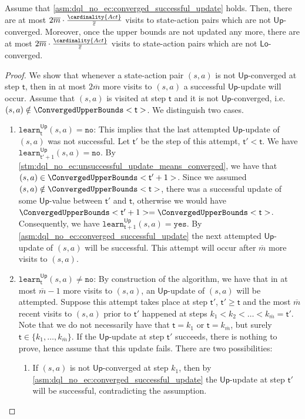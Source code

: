 \documentclass{article}
\newcommand{\Actions}{Act}
\newcommand{\upperbound}{\mathsf{Up}}
\newcommand{\lowerbound}{\mathsf{Lo}}
\newcommand{\updatestep}{{\overline{\varepsilon}}}
\newcommand{\delay}{{\overline{m}}}
\newcommand{\learn}{\texttt{learn}}
\newcommand{\learnyes}{\texttt{yes}}
\newcommand{\learnno}{\texttt{no}}
\newcommand{\algostep}{\mathsf{t}}
\begin{document}
\begin{lemma} \label{stm:dql_no_ec:non_converged_visit_count}
	Assume that \cref{asm:dql_no_ec:converged_successful_update} holds.
	Then, there are at most $2 \delay \cdot \frac{\cardinality{\Actions}}{\updatestep}$ visits to state-action pairs which are not $\upperbound$-converged.
	Moreover, once the upper bounds are not updated any more, there are at most $2 \delay \cdot \frac{\cardinality{\Actions}}{\updatestep}$ visits to state-action pairs which are not $\lowerbound$-converged.
\end{lemma}

\begin{proof}
	We show that whenever a state-action pair $(s, a)$ is not $\upperbound$-converged at step $\algostep$, then in at most $2 \delay$ more visits to $(s, a)$ a successful $\upperbound$-update will occur.
	Assume that $(s, a)$ is visited at step $\algostep$ and it is not $\upperbound$-converged, i.e.\ $(s, a) \notin \ConvergedUpperBounds<\algostep>$.
	We distinguish two cases.
	\begin{enumerate}
		\item $\learn^\upperbound_\algostep(s, a) = \learnno$:
		This implies that the last attempted $\upperbound$-update of $(s, a)$ was not successful.
		Let $\algostep'$ be the step of this attempt, $\algostep' < \algostep$.
		We have $\learn^\upperbound_{\algostep' + 1}(s, a) = \learnno$.
		By \cref{stm:dql_no_ec:unsuccessful_update_means_converged}, we have that $(s, a) \in \ConvergedUpperBounds<\algostep'+1>$.
		Since we assumed $(s, a) \notin \ConvergedUpperBounds<\algostep>$, there was a successful update of some $\upperbound$-value between $\algostep'$ and $\algostep$, otherwise we would have $\ConvergedUpperBounds<\algostep'+1> = \ConvergedUpperBounds<\algostep>$.
		Consequently, we have $\learn^\upperbound_{\algostep+1}(s, a) = \learnyes$.
		By \cref{asm:dql_no_ec:converged_successful_update} the next attempted $\upperbound$-update of $(s, a)$ will be successful.
		This attempt will occur after $\delay$ more visits to $(s, a)$.

		\item $\learn^\upperbound_\algostep(s, a) \neq \learnno$:
		By construction of the algorithm, we have that in at most $\delay - 1$ more visits to $(s, a)$, an $\upperbound$-update of $(s, a)$ will be attempted.
		Suppose this attempt takes place at step $\algostep'$, $\algostep' \geq \algostep$ and the most $\delay$ recent visits to $(s, a)$ prior to $\algostep'$ happened at steps $k_1 < k_2 < \ldots < k_\delay = \algostep'$.
		Note that we do not necessarily have that $\algostep = k_1$ or $\algostep = k_\delay$, but surely $\algostep \in \{k_1, \dots, k_\delay\}$.
		If the $\upperbound$-update at step $\algostep'$ succeeds, there is nothing to prove, hence assume that this update fails.
		There are two possibilities:
		\begin{enumerate}
			\item
			If $(s, a)$ is not $\upperbound$-converged at step $k_1$, then by \cref{asm:dql_no_ec:converged_successful_update} the $\upperbound$-update at step $\algostep'$ will be successful, contradicting the assumption.


\end{enumerate}
\end{enumerate}
\end{proof}
\end{document}
